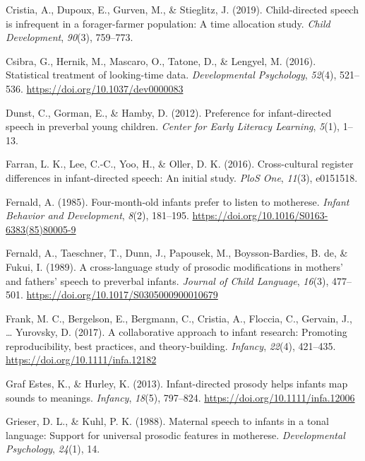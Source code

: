 \documentclass[
  ,man,floatsintext]{apa6}
\newlength{\cslhangindent}
\newlength{\cslentryspacingunit} %
\newenvironment{CSLReferences}[2] %
 {%
  \setlength{\parindent}{0pt}
  \ifodd #1
  \let\oldpar\par
  \def\par{\hangindent=\cslhangindent\oldpar}
  \fi
  \setlength{\parskip}{#2\cslentryspacingunit}
 }%
 {}
\begin{document}
\begin{CSLReferences}{1}{0}
\leavevmode{}%
Cristia, A., Dupoux, E., Gurven, M., \& Stieglitz, J. (2019). Child-directed speech is infrequent in a forager-farmer population: A time allocation study. \emph{Child Development}, \emph{90}(3), 759--773.

\leavevmode{}%
Csibra, G., Hernik, M., Mascaro, O., Tatone, D., \& Lengyel, M. (2016). Statistical treatment of looking-time data. \emph{Developmental Psychology}, \emph{52}(4), 521--536. \url{https://doi.org/10.1037/dev0000083}

\leavevmode{}%
Dunst, C., Gorman, E., \& Hamby, D. (2012). Preference for infant-directed speech in preverbal young children. \emph{Center for Early Literacy Learning}, \emph{5}(1), 1--13.

\leavevmode{}%
Farran, L. K., Lee, C.-C., Yoo, H., \& Oller, D. K. (2016). Cross-cultural register differences in infant-directed speech: An initial study. \emph{PloS One}, \emph{11}(3), e0151518.

\leavevmode{}%
Fernald, A. (1985). Four-month-old infants prefer to listen to motherese. \emph{Infant Behavior and Development}, \emph{8}(2), 181--195. \url{https://doi.org/10.1016/S0163-6383(85)80005-9}

\leavevmode{}%
Fernald, A., Taeschner, T., Dunn, J., Papousek, M., Boysson-Bardies, B. de, \& Fukui, I. (1989). A cross-language study of prosodic modifications in mothers' and fathers' speech to preverbal infants. \emph{Journal of Child Language}, \emph{16}(3), 477--501. \url{https://doi.org/10.1017/S0305000900010679}

\leavevmode{}%
Frank, M. C., Bergelson, E., Bergmann, C., Cristia, A., Floccia, C., Gervain, J., \ldots{} Yurovsky, D. (2017). A collaborative approach to infant research: Promoting reproducibility, best practices, and theory-building. \emph{Infancy}, \emph{22}(4), 421--435. \url{https://doi.org/10.1111/infa.12182}

\leavevmode{}%
Graf Estes, K., \& Hurley, K. (2013). Infant-directed prosody helps infants map sounds to meanings. \emph{Infancy}, \emph{18}(5), 797--824. \url{https://doi.org/10.1111/infa.12006}

\leavevmode{}%
Grieser, D. L., \& Kuhl, P. K. (1988). Maternal speech to infants in a tonal language: Support for universal prosodic features in motherese. \emph{Developmental Psychology}, \emph{24}(1), 14.


\end{CSLReferences}
\end{document}
